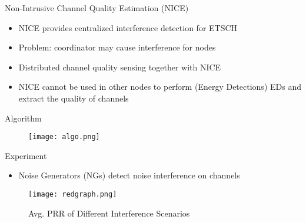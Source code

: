 \documentclass[t]{beamer}
\begin{document}
\begin{frame}{Non-Intrusive Channel Quality Estimation (NICE)}
\begin{itemize}
  \item NICE provides centralized interference detection for ETSCH
  \\
  \item Problem: coordinator may cause interference for nodes
  \\
  \item Distributed channel quality sensing together with NICE
  \\
  \item  NICE cannot be used in other nodes to perform (Energy Detections) EDs and extract the quality of channels \cite{energy}
  \end{itemize}


\end{frame}

\begin{frame}{Algorithm}
\begin{itemize}
\end{itemize}
\begin{figure}[htp]
\centering
\texttt{[image: algo.png]}
\label{fig:lion}
\end{figure}
\begin{itemize}
\end{itemize}

\end{frame}

\begin{frame}{Experiment}
\begin{itemize}
    \item{Noise Generators (NGs) detect noise interference on channels}
\end{itemize}
\begin{figure}[htp]
\centering
\vspace{-4mm}
\texttt{[image: redgraph.png]}
\label{fig:red}
\caption{Avg. PRR of Different Interference Scenarios}
\end{figure}
\end{frame}
\end{document}
